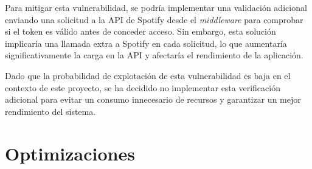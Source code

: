 Para mitigar esta vulnerabilidad, se podría implementar una validación adicional enviando una solicitud a la API de Spotify desde el \textit{middleware} para comprobar si el token es válido antes de conceder acceso. Sin embargo, esta solución implicaría una llamada extra a Spotify en cada solicitud, lo que aumentaría significativamente la carga en la API y afectaría el rendimiento de la aplicación.

Dado que la probabilidad de explotación de esta vulnerabilidad es baja en el contexto de este proyecto, se ha decidido no implementar esta verificación adicional para evitar un consumo innecesario de recursos y garantizar un mejor rendimiento del sistema.


\section{Optimizaciones}